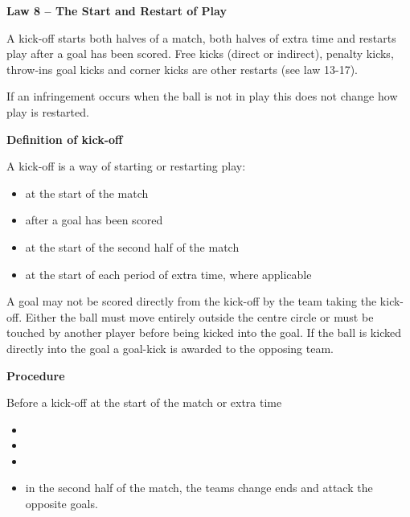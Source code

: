 \clearpage
\sffamily
{\bfseries\color[rgb]{0.4,0.4,0.4}
Law 8 -- The Start and Restart of Play}
{}

\bigskip

A kick-off starts both halves of a match, both halves of extra time and restarts
play after a goal has been scored.
Free kicks (direct or indirect), penalty kicks, throw-ins goal kicks and corner
kicks are other restarts (see law 13-17).

\bigskip

If an infringement occurs when the ball is not in play this does not change how
play is restarted.

\bigskip

{\bfseries Definition of kick-off}

\headlinebox

A kick-off is a way of starting or restarting play:

\begin{itemize}
\item at the start of the match 
\item after a goal has been scored 
\item at the start of the second half of the match 
\item at the start of each period of extra time, where applicable
\end{itemize}

A goal may not be scored directly from the kick-off by the team taking the kick-off.
Either the ball must move entirely outside the centre circle or must be touched
by another player before being kicked into the goal.
If the ball is kicked directly into the goal a goal-kick
is awarded to the opposing team.

\bigskip

{\bfseries Procedure }

\headlinebox

Before a kick-off at the start of the match or extra time 

\begin{itemize}
\item {}
\item {}
\item {}
\item in the second half of the match, the teams change ends and attack the opposite goals. 
\end{itemize}

